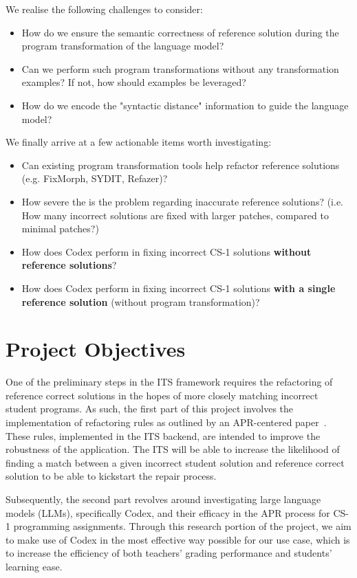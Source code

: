 We realise the following challenges to consider:
\begin{itemize}
    \item How do we ensure the semantic correctness of reference solution during the program
          transformation of the language model?
    \item Can we perform such program transformations without any transformation examples?
          If not, how should examples be leveraged?
    \item How do we encode the "syntactic distance" information to guide the language model?
\end{itemize}

We finally arrive at a few actionable items worth investigating:
\begin{itemize}
    \item Can existing program transformation tools help refactor reference solutions
          (e.g. FixMorph, SYDIT, Refazer)?
    \item How severe the is the problem regarding inaccurate reference solutions?
          (i.e. How many incorrect solutions are fixed with larger patches, compared
           to minimal patches?)
    \item How does Codex perform in fixing incorrect CS-1 solutions \textbf{without reference solutions}?
    \item How does Codex perform in fixing incorrect CS-1 solutions \textbf{with a single reference
          solution} (without program transformation)?
\end{itemize}

\section{Project Objectives}

One of the preliminary steps in the ITS framework requires the refactoring of reference correct
solutions in the hopes of more closely matching incorrect student programs.
As such, the first part of this project involves the implementation of refactoring rules as
outlined by an APR-centered paper~\cite{hu2019re}.
These rules, implemented in the ITS backend, are intended to improve the robustness of the
application.
The ITS will be able to increase the likelihood of finding a match between a given incorrect
student solution and reference correct solution to be able to kickstart the repair process.

Subsequently, the second part revolves around investigating large language models (LLMs),
specifically Codex, and their efficacy in the APR process for CS-1 programming assignments.
Through this research portion of the project, we aim to make use of Codex in the most
effective way possible for our use case, which is to increase the efficiency of both
teachers' grading performance and students' learning ease.

